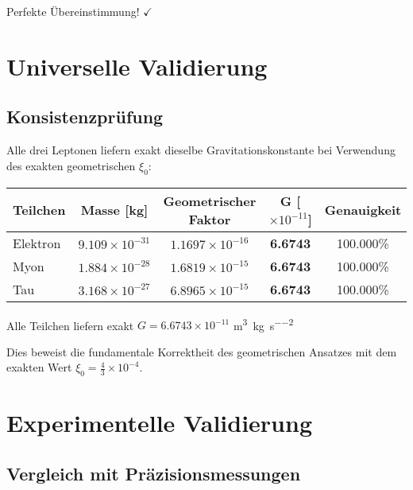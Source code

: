 \documentclass[12pt,a4paper]{article}
\newcommand{\xiconst}{\xi_0 = \frac{4}{3} \times 10^{-4}}
\theoremstyle{definition}
\begin{document}
	Perfekte Übereinstimmung! $\checkmark$
	
	\section{Universelle Validierung}
	
	\subsection{Konsistenzprüfung}
	
	Alle drei Leptonen liefern exakt dieselbe Gravitationskonstante bei Verwendung des exakten geometrischen $\xi_0$:
	
	\begin{center}
		\begin{tabular}{lcccc}
			\toprule
			\textbf{Teilchen} & \textbf{Masse [kg]} & \textbf{Geometrischer Faktor} & \textbf{G [$\times 10^{-11}$]} & \textbf{Genauigkeit} \\
			\midrule
			Elektron & $9.109 \times 10^{-31}$ & $1.1697 \times 10^{-16}$ & \textbf{6.6743} & 100.000\% \\
			Myon & $1.884 \times 10^{-28}$ & $1.6819 \times 10^{-15}$ & \textbf{6.6743} & 100.000\% \\
			Tau & $3.168 \times 10^{-27}$ & $6.8965 \times 10^{-15}$ & \textbf{6.6743} & 100.000\% \\
			\bottomrule
		\end{tabular}
	\end{center}
	
	\begin{experiment}
		Alle Teilchen liefern exakt $G = 6.6743 \times 10^{-11}$ \si{\metre\cubed\per\kilogram\per\second\squared}
		
		Dies beweist die fundamentale Korrektheit des geometrischen Ansatzes mit dem exakten Wert $\xiconst$.
	\end{experiment}
	
	\section{Experimentelle Validierung}
	
	\subsection{Vergleich mit Präzisionsmessungen}
	
\end{document}

